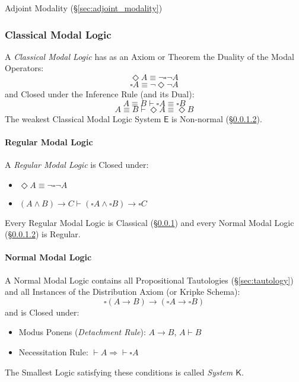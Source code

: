 Adjoint Modality (\S\ref{sec:adjoint_modality})



\subsubsection{Classical Modal Logic}\label{sec:classical_modal}

A \emph{Classical Modal Logic} has as an Axiom or Theorem the Duality
of the Modal Operators:
\[
  \Diamond A \equiv \neg \square \neg A
\]\[
  \square A \equiv \neg \Diamond \neg A
\]
and Closed under the Inference Rule (and its Dual):
\[
  A \equiv B \vdash \square A \equiv \square B
\]\[
  A \equiv B \vdash \Diamond A \equiv \Diamond B
\]
The weakest Classical Modal Logic System $\mathsf{E}$ is Non-normal
(\S\ref{sec:normal_modal}).



\paragraph{Regular Modal Logic}\label{sec:regular_modal}\hfill

A \emph{Regular Modal Logic} is Closed under:
\begin {itemize}

\item $\Diamond A \equiv \neg \square \neg A$

\item $(A \wedge B) \rightarrow C \vdash
  (\square A \wedge \square B) \rightarrow \square C$

\end {itemize}
Every Regular Modal Logic is Classical (\S\ref{sec:classical_modal})
and every Normal Modal Logic (\S\ref{sec:normal_modal}) is Regular.



\paragraph{Normal Modal Logic}\label{sec:normal_modal}\hfill

A Normal Modal Logic contains all Propositional Tautologies
(\S\ref{sec:tautology}) and all Instances of the Distribution Axiom
(or Kripke Schema):
\[
  \square (A \rightarrow B) \rightarrow
  (\square A \rightarrow \square B)
\]
and is Closed under:
\begin{itemize}
  \item Modus Ponens (\emph{Detachment Rule}): $A \rightarrow B$, $A
    \vdash B$
  \item Necessitation Rule: $\vdash A \Rightarrow \vdash \square A$
\end{itemize}
The Smallest Logic satisfying these conditions is called \emph{System
  $\mathsf{K}$}.



